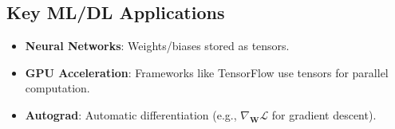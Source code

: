 \documentclass[12pt]{article}
\begin{document}
\subsection*{Key ML/DL Applications}
\begin{itemize}
    \item \textbf{Neural Networks}: Weights/biases stored as tensors.
    \item \textbf{GPU Acceleration}: Frameworks like TensorFlow use tensors for parallel computation.
    \item \textbf{Autograd}: Automatic differentiation (e.g., $\nabla_{\bm{W}} \mathcal{L}$ for gradient descent).
\end{itemize}
\end{document}
